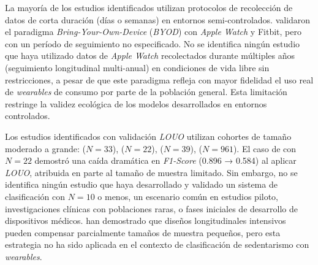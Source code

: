 La mayoría de los estudios identificados utilizan protocolos de recolección de datos de corta duración (días o semanas) en entornos semi-controlados. \cite{Fuller2021Predicting} validaron el paradigma \textit{Bring-Your-Own-Device} (\textit{BYOD}) con \textit{Apple Watch} y Fitbit, pero con un período de seguimiento no especificado. No se identifica ningún estudio que haya utilizado datos de \textit{Apple Watch} recolectados durante múltiples años (seguimiento longitudinal multi-anual) en condiciones de vida libre sin restricciones, a pesar de que este paradigma refleja con mayor fidelidad el uso real de \textit{wearables} de consumo por parte de la población general. Esta limitación restringe la validez ecológica de los modelos desarrollados en entornos controlados.

Los estudios identificados con validación \textit{LOUO} utilizan cohortes de tamaño moderado a grande: \cite{Fuller2021Predicting} ($N=33$), \cite{Mathew2024LOSO} ($N=22$), \cite{OGrady2024AppleWatch} ($N=39$), \cite{Marino2024ARIC} ($N=961$). El caso de \cite{Mathew2024LOSO} con $N=22$ demostró una caída dramática en \textit{F1-Score} (0.896 → 0.584) al aplicar \textit{LOUO}, atribuida en parte al tamaño de muestra limitado. Sin embargo, no se identifica ningún estudio que haya desarrollado y validado un sistema de clasificación con $N=10$ o menos, un escenario común en estudios piloto, investigaciones clínicas con poblaciones raras, o fases iniciales de desarrollo de dispositivos médicos. \cite{Bolger2013} han demostrado que diseños longitudinales intensivos pueden compensar parcialmente tamaños de muestra pequeños, pero esta estrategia no ha sido aplicada en el contexto de clasificación de sedentarismo con \textit{wearables}.
